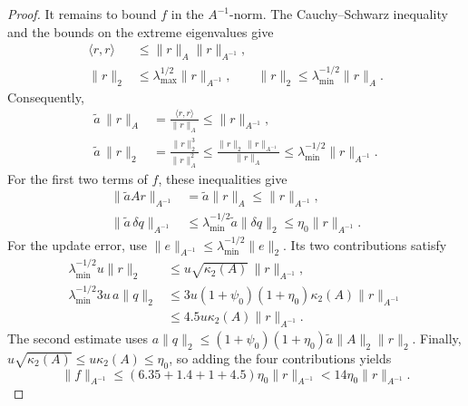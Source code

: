 \documentclass[11pt]{article}
\theoremstyle{definition}
\begin{document}
\begin{proof}
It remains to bound $f$ in the $A^{-1}$-norm. The Cauchy--Schwarz
inequality and the bounds on the extreme eigenvalues give
\begin{equation}
\begin{aligned}
 \langle r,r\rangle&\le\|r\|_A\|r\|_{A^{-1}},\\
 \|r\|_2&\le\lambda_{\max}^{1/2}\|r\|_{A^{-1}},
 \qquad
 \|r\|_2\le\lambda_{\min}^{-1/2}\|r\|_A.
\end{aligned}
 \label{eq:three-inequalities}
\end{equation}
Consequently,
\begin{equation}
\begin{aligned}
 \tilde a\,\|r\|_A
   &=\frac{\langle r,r\rangle}{\|r\|_A}
     \le\|r\|_{A^{-1}},\\
 \tilde a\,\|r\|_2
   &=\frac{\|r\|_2^3}{\|r\|_A^2}
     \le\frac{\|r\|_2\,\|r\|_{A^{-1}}}{\|r\|_A}
     \le\lambda_{\min}^{-1/2}\|r\|_{A^{-1}}.
\end{aligned}
 \label{eq:a-tilde-bounds}
\end{equation}
For the first two terms of $f$, these inequalities give
\[
\begin{aligned}
 \|\tilde aAr\|_{A^{-1}}
   &=\tilde a\|r\|_A\le\|r\|_{A^{-1}},\\
 \|\tilde a\,\delta q\|_{A^{-1}}
   &\le\lambda_{\min}^{-1/2}\tilde a\|\delta q\|_2
     \le\eta_0\|r\|_{A^{-1}}.
\end{aligned}
\]
For the update error, use
$\|e\|_{A^{-1}}\le\lambda_{\min}^{-1/2}\|e\|_2$.
Its two contributions satisfy
\[
\begin{aligned}
 \lambda_{\min}^{-1/2}u\|r\|_2
   &\le u\sqrt{\kappa_2(A)}\,\|r\|_{A^{-1}},\\
 \lambda_{\min}^{-1/2}3u\,a\|q\|_2
   &\le3u(1+\psi_0)(1+\eta_0)\kappa_2(A)\|r\|_{A^{-1}}\\
   &\le4.5u\kappa_2(A)\|r\|_{A^{-1}}.
\end{aligned}
\]
The second estimate uses
$a\|q\|_2\le(1+\psi_0)(1+\eta_0)\tilde a\|A\|_2\|r\|_2$.
Finally, $u\sqrt{\kappa_2(A)}\le u\kappa_2(A)\le\eta_0$, so adding
the four contributions yields
\[
 \|f\|_{A^{-1}}
 \le(6.35+1.4+1+4.5)\eta_0\|r\|_{A^{-1}}
 <14\eta_0\|r\|_{A^{-1}}.
\]
\end{proof}
\end{document}
